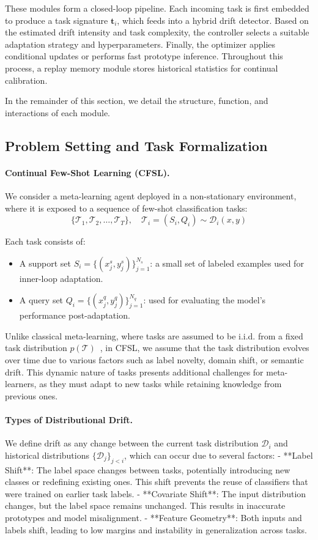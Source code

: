 \documentclass[conference]{IEEEtran}
\begin{document}
These modules form a closed-loop pipeline. Each incoming task is first embedded to produce a task signature $\mathbf{t}_i$, which feeds into a hybrid drift detector. Based on the estimated drift intensity and task complexity, the controller selects a suitable adaptation strategy and hyperparameters. Finally, the optimizer applies conditional updates or performs fast prototype inference. Throughout this process, a replay memory module stores historical statistics for continual calibration.

In the remainder of this section, we detail the structure, function, and interactions of each module.


\subsection*{Problem Setting and Task Formalization}

\paragraph{Continual Few-Shot Learning (CFSL).}
We consider a meta-learning agent deployed in a non-stationary environment, where it is exposed to a sequence of few-shot classification tasks:
\[
\{\mathcal{T}_1, \mathcal{T}_2, \dots, \mathcal{T}_T\}, \quad \mathcal{T}_i = (S_i, Q_i) \sim \mathcal{D}_i(x, y)
\]

Each task consists of:
\begin{itemize}
    \item A support set $S_i = \{(x_j^s, y_j^s)\}_{j=1}^{N_s}$: a small set of labeled examples used for inner-loop adaptation.
    \item A query set $Q_i = \{(x_j^q, y_j^q)\}_{j=1}^{N_q}$: used for evaluating the model's performance post-adaptation.
\end{itemize}

Unlike classical meta-learning, where tasks are assumed to be i.i.d. from a fixed task distribution $p(\mathcal{T})$~\cite{finn2017maml}, in CFSL, we assume that the task distribution evolves over time due to various factors such as label novelty, domain shift, or semantic drift. This dynamic nature of tasks presents additional challenges for meta-learners, as they must adapt to new tasks while retaining knowledge from previous ones.

\paragraph{Types of Distributional Drift.}
We define drift as any change between the current task distribution $\mathcal{D}_i$ and historical distributions $\{\mathcal{D}_j\}_{j<i}$, which can occur due to several factors:
- **Label Shift**: The label space changes between tasks, potentially introducing new classes or redefining existing ones. This shift prevents the reuse of classifiers that were trained on earlier task labels.
- **Covariate Shift**: The input distribution changes, but the label space remains unchanged. This results in inaccurate prototypes and model misalignment.
- **Feature Geometry**: Both inputs and labels shift, leading to low margins and instability in generalization across tasks.
\end{document}
